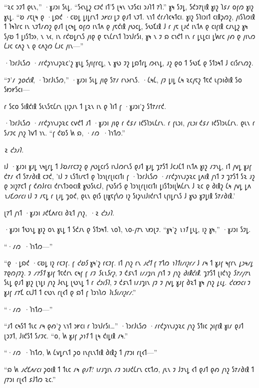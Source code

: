 “𐑷𐑤 𐑮𐑲𐑑 𐑞𐑧𐑯,” ·𐑣𐑨𐑮𐑦 𐑕𐑧𐑛. “𐑕𐑬𐑯𐑛𐑟 𐑤𐑲𐑒 𐑦𐑑'𐑕 𐑚𐑰𐑯 𐑯𐑲𐑕𐑤𐑦 𐑮𐑨𐑐𐑑 𐑳𐑐.” 𐑣𐑰 𐑕𐑲𐑛, 𐑕𐑒𐑮𐑳𐑚𐑦𐑙 𐑣𐑦𐑟 𐑐𐑭𐑥 𐑴𐑝𐑼 𐑣𐑦𐑟 𐑣𐑧𐑛. “𐑹 𐑥𐑱𐑚𐑰 𐑞 ·𐑛𐑸𐑒 ·𐑤𐑹𐑛 𐑛𐑦𐑛𐑩𐑯𐑑 \emph{𐑮𐑾𐑤𐑦} 𐑛𐑲 𐑞𐑨𐑑 𐑯𐑲𐑑. 𐑯𐑪𐑑 𐑒𐑩𐑥𐑐𐑤𐑰𐑑𐑤𐑦. 𐑣𐑦𐑟 𐑕𐑐𐑦𐑮𐑦𐑑 𐑤𐑦𐑙𐑜𐑼𐑟, 𐑢𐑦𐑕𐑐𐑼𐑦𐑙 𐑑 𐑐𐑰𐑐𐑩𐑤 𐑦𐑯 𐑯𐑲𐑑𐑥𐑺𐑟 𐑞𐑨𐑑 𐑚𐑤𐑰𐑛 𐑴𐑝𐑼 𐑦𐑯𐑑𐑵 𐑞 𐑢𐑱𐑒𐑦𐑙 𐑢𐑻𐑤𐑛, 𐑕𐑻𐑗𐑦𐑙 𐑓 𐑩 𐑢𐑱 𐑚𐑨𐑒 𐑦𐑯𐑑𐑵 𐑞 𐑤𐑦𐑝𐑦𐑙 𐑤𐑨𐑯𐑛𐑟 𐑣𐑰 𐑕𐑢𐑹 𐑑 𐑛𐑦𐑕𐑑𐑮𐑶, 𐑯 𐑯𐑬, 𐑦𐑯 𐑩𐑒𐑹𐑛𐑩𐑯𐑕 𐑢𐑦𐑞 𐑞 𐑱𐑯𐑖𐑩𐑯𐑑 𐑐𐑮𐑪𐑓𐑩𐑕𐑦, 𐑣𐑰 𐑯 𐑲 𐑸 𐑤𐑪𐑒𐑑 𐑦𐑯 𐑩 𐑛𐑧𐑛𐑤𐑦 𐑛𐑿𐑩𐑤 𐑢𐑺 𐑞 𐑢𐑦𐑯𐑼 𐑖𐑨𐑤 𐑤𐑵𐑟 𐑯 𐑞 𐑤𐑵𐑟𐑼 𐑖𐑨𐑤 𐑢𐑦𐑯—”

·𐑐𐑮𐑩𐑓𐑧𐑕𐑼 ·𐑥𐑩𐑒𐑜𐑪𐑯𐑨𐑜𐑷𐑤'𐑟 𐑣𐑧𐑛 𐑕𐑢𐑦𐑝𐑩𐑤𐑛, 𐑯 𐑣𐑻 𐑲𐑟 𐑛𐑸𐑑𐑩𐑛 𐑼𐑬𐑯𐑛, 𐑨𐑟 𐑞𐑴 𐑑 𐑕𐑻𐑗 𐑞 𐑕𐑑𐑮𐑰𐑑 𐑓 𐑤𐑦𐑕𐑩𐑯𐑼𐑟.

“𐑲'𐑥 \emph{𐑡𐑴𐑒𐑦𐑙}, ·𐑐𐑮𐑩𐑓𐑧𐑕𐑼,” ·𐑣𐑨𐑮𐑦 𐑕𐑧𐑛 𐑢𐑦𐑞 𐑕𐑳𐑥 𐑩𐑯𐑶𐑩𐑯𐑕. ·𐑖𐑰𐑖, 𐑢𐑲 𐑛𐑦𐑛 𐑖𐑰 𐑷𐑤𐑢𐑱𐑟 𐑑𐑱𐑒 𐑧𐑝𐑮𐑦𐑔𐑦𐑙 𐑕𐑴 𐑕𐑽𐑾𐑕𐑤𐑦—

𐑩 𐑕𐑤𐑴 𐑕𐑦𐑙𐑒𐑦𐑙 𐑕𐑧𐑯𐑕𐑱𐑖𐑩𐑯 𐑚𐑦𐑜𐑨𐑯 𐑑 𐑛𐑷𐑯 𐑦𐑯 𐑞 𐑐𐑦𐑑 𐑝 ·𐑣𐑨𐑮𐑦'𐑟 𐑕𐑑𐑳𐑥𐑩𐑒.

·𐑐𐑮𐑩𐑓𐑧𐑕𐑼 ·𐑥𐑩𐑒𐑜𐑪𐑯𐑨𐑜𐑷𐑤 𐑤𐑫𐑒𐑑 𐑨𐑑 ·𐑣𐑨𐑮𐑦 𐑢𐑦𐑞 𐑩 𐑒𐑭𐑥 𐑦𐑒𐑕𐑐𐑮𐑧𐑖𐑩𐑯. 𐑩 𐑝𐑧𐑮𐑦, \emph{𐑝𐑧𐑮𐑦} 𐑒𐑭𐑥 𐑦𐑒𐑕𐑐𐑮𐑧𐑖𐑩𐑯. 𐑞𐑧𐑯 𐑩 𐑕𐑥𐑲𐑤 𐑢𐑪𐑟 𐑐𐑫𐑑 𐑪𐑯. “𐑝 𐑒𐑹𐑕 𐑿 𐑸, ·𐑥𐑼~·𐑐𐑪𐑑𐑼.”

\emph{𐑷 𐑒𐑮𐑨𐑐.}

𐑦𐑓 ·𐑣𐑨𐑮𐑦 𐑣𐑨𐑛 𐑯𐑰𐑛𐑩𐑛 𐑑 𐑓𐑹𐑥𐑩𐑤𐑲𐑟 𐑞 𐑢𐑻𐑛𐑤𐑩𐑕 𐑦𐑯𐑓𐑼𐑩𐑯𐑕 𐑞𐑨𐑑 𐑣𐑨𐑛 𐑡𐑳𐑕𐑑 𐑓𐑤𐑨𐑖𐑑 𐑦𐑯𐑑𐑵 𐑣𐑦𐑟 𐑥𐑲𐑯𐑛, 𐑦𐑑 𐑢𐑫𐑛 𐑣𐑨𐑝 𐑒𐑳𐑥 𐑬𐑑 𐑕𐑳𐑥𐑔𐑦𐑙 𐑤𐑲𐑒, '𐑦𐑓 𐑲 𐑧𐑕𐑑𐑦𐑥𐑱𐑑 𐑞 𐑐𐑮𐑪𐑚𐑩𐑚𐑦𐑤𐑦𐑑𐑦 𐑝 ·𐑐𐑮𐑩𐑓𐑧𐑕𐑼 ·𐑥𐑩𐑒𐑜𐑪𐑯𐑨𐑜𐑷𐑤 𐑛𐑵𐑦𐑙 𐑢𐑪𐑑 𐑲 𐑡𐑳𐑕𐑑 𐑕𐑷 𐑨𐑟 𐑞 𐑮𐑦𐑟𐑳𐑤𐑑 𐑝 𐑒𐑺𐑓𐑩𐑤𐑦 𐑒𐑩𐑯𐑑𐑮𐑴𐑤𐑦𐑙 𐑣𐑻𐑕𐑧𐑤𐑓, 𐑝𐑻𐑕𐑩𐑕 𐑞 𐑐𐑮𐑪𐑚𐑩𐑚𐑦𐑤𐑦𐑑𐑦 𐑛𐑦𐑕𐑑𐑮𐑦𐑚𐑿𐑖𐑩𐑯 𐑓 𐑷𐑤 𐑞 𐑔𐑦𐑙𐑟 𐑖𐑰 𐑢𐑫𐑛 𐑛𐑵 \emph{𐑯𐑨𐑗𐑼𐑩𐑤𐑦} 𐑦𐑓 𐑲 𐑥𐑱𐑛 𐑩 𐑚𐑨𐑛 𐑡𐑴𐑒, 𐑞𐑧𐑯 𐑞𐑦𐑕 𐑚𐑦𐑣𐑱𐑝𐑘𐑼 𐑦𐑟 𐑕𐑦𐑜𐑯𐑦𐑓𐑦𐑒𐑩𐑯𐑑 𐑧𐑝𐑦𐑛𐑩𐑯𐑕 𐑓 𐑣𐑻 𐑣𐑲𐑛𐑦𐑙 𐑕𐑳𐑥𐑔𐑦𐑙.'

𐑚𐑳𐑑 𐑢𐑪𐑑 ·𐑣𐑨𐑮𐑦 𐑨𐑒𐑗𐑵𐑩𐑤𐑦 𐑔𐑷𐑑 𐑢𐑪𐑟, \emph{·𐑷 𐑒𐑮𐑨𐑐.}

·𐑣𐑨𐑮𐑦 𐑑𐑻𐑯𐑛 𐑣𐑦𐑟 𐑴𐑯 𐑣𐑧𐑛 𐑑 𐑕𐑒𐑨𐑯 𐑞 𐑕𐑑𐑮𐑰𐑑. 𐑯𐑴𐑐, 𐑯𐑴-𐑢𐑳𐑯 𐑯𐑽𐑚𐑲. “𐑣𐑰'𐑟 \emph{𐑯𐑪𐑑} 𐑛𐑧𐑛, 𐑦𐑟 𐑣𐑰,” ·𐑣𐑨𐑮𐑦 𐑕𐑲𐑛.

“·𐑥𐑼~·𐑐𐑪𐑑𐑼—”

“𐑞 ·𐑛𐑸𐑒 ·𐑤𐑹𐑛 𐑦𐑟 𐑩𐑤𐑲𐑝. 𐑝 \emph{𐑒𐑹𐑕} 𐑣𐑰'𐑟 𐑩𐑤𐑲𐑝. 𐑦𐑑 𐑢𐑪𐑟 𐑩𐑯 \emph{𐑨𐑒𐑑} 𐑝 𐑳𐑑𐑼 \emph{𐑪𐑐𐑑𐑦𐑥𐑦𐑟𐑩𐑥} 𐑓 𐑥𐑰 𐑑 𐑣𐑨𐑝 𐑰𐑝𐑩𐑯 \emph{𐑛𐑮𐑰𐑥𐑛} 𐑳𐑞𐑼𐑢𐑲𐑟. 𐑲 \emph{𐑥𐑳𐑕𐑑} 𐑣𐑨𐑝 𐑑𐑱𐑒𐑩𐑯 𐑤𐑰𐑝 𐑝 𐑥𐑲 \emph{𐑕𐑧𐑯𐑕𐑩𐑟}, 𐑲 𐑒𐑭𐑯𐑑 \emph{𐑦𐑥𐑨𐑡𐑦𐑯} 𐑢𐑪𐑑 𐑲 𐑢𐑪𐑟 \emph{𐑔𐑦𐑙𐑒𐑦𐑙}. 𐑡𐑳𐑕𐑑 𐑚𐑦𐑒𐑪𐑟 \emph{𐑕𐑳𐑥𐑢𐑳𐑯} 𐑕𐑧𐑛 𐑞𐑨𐑑 𐑣𐑦𐑟 𐑚𐑪𐑛𐑦 𐑢𐑪𐑟 𐑓𐑬𐑯𐑛 𐑚𐑻𐑯𐑛 𐑑 𐑩 \emph{𐑒𐑮𐑦𐑕𐑐}, 𐑲 𐑒𐑭𐑯𐑑 𐑦𐑥𐑨𐑡𐑦𐑯 𐑢𐑲 𐑲 𐑢𐑫𐑛 𐑣𐑨𐑝 𐑔𐑷𐑑 𐑣𐑰 𐑢𐑪𐑟 \emph{𐑛𐑧𐑛}. \emph{𐑒𐑤𐑽𐑤𐑦} 𐑲 𐑣𐑨𐑝 𐑥𐑳𐑗 𐑤𐑧𐑓𐑑 𐑑 𐑤𐑻𐑯 𐑩𐑚𐑬𐑑 𐑞 𐑸𐑑 𐑝 𐑐𐑮𐑪𐑐𐑼 \emph{𐑐𐑧𐑕𐑦𐑥𐑦𐑟𐑩𐑥}.”

“·𐑥𐑼~·𐑐𐑪𐑑𐑼—”

“𐑨𐑑 𐑤𐑰𐑕𐑑 𐑑𐑧𐑤 𐑥𐑰 𐑞𐑺'𐑟 𐑯𐑪𐑑 𐑮𐑾𐑤𐑦 𐑩 𐑐𐑮𐑪𐑓𐑩𐑕𐑦…” ·𐑐𐑮𐑩𐑓𐑧𐑕𐑼 ·𐑥𐑩𐑒𐑜𐑪𐑯𐑨𐑜𐑷𐑤 𐑢𐑪𐑟 𐑕𐑑𐑦𐑤 𐑜𐑦𐑝𐑦𐑙 𐑣𐑦𐑥 𐑞𐑨𐑑 𐑚𐑮𐑲𐑑, 𐑓𐑦𐑒𐑕𐑑 𐑕𐑥𐑲𐑤. “𐑴, 𐑿 𐑣𐑨𐑝 \emph{𐑜𐑪𐑑} 𐑑 𐑚𐑰 𐑒𐑦𐑛𐑦𐑙 𐑥𐑰.”

“·𐑥𐑼~·𐑐𐑪𐑑𐑼, 𐑿 𐑖𐑫𐑛𐑩𐑯𐑑 𐑜𐑴 𐑦𐑯𐑝𐑧𐑯𐑑𐑦𐑙 𐑔𐑦𐑙𐑟 𐑑 𐑢𐑳𐑮𐑦 𐑩𐑚𐑬𐑑—”

“𐑸 𐑿 \emph{𐑨𐑒𐑗𐑵𐑩𐑤𐑦} 𐑜𐑴𐑦𐑙 𐑑 𐑑𐑧𐑤 𐑥𐑰 \emph{𐑞𐑨𐑑}? 𐑦𐑥𐑨𐑡𐑦𐑯 𐑥𐑲 𐑮𐑦𐑨𐑒𐑖𐑩𐑯 𐑤𐑱𐑑𐑼, 𐑢𐑧𐑯 𐑲 𐑓𐑲𐑯𐑛 𐑬𐑑 𐑞𐑨𐑑 𐑞𐑺 𐑢𐑪𐑟 𐑕𐑳𐑥𐑔𐑦𐑙 𐑑 𐑢𐑳𐑮𐑦 𐑩𐑚𐑬𐑑 𐑭𐑓𐑑𐑼 𐑷𐑤.”

